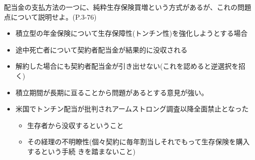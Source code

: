 \documentclass[report,gutter=10mm,fore-edge=10mm,uplatex,dvipdfmx]{jlreq}
\begin{document}
配当金の支払方法の一つに、純粋生存保険買増という方式があるが、これの問題点について説明せよ。(P.3-76)

\begin{itemize}
 \item 積立型の年金保険について生存保障性(トンチン性)を強化しようとする場合
 \item 途中死亡者について契約者配当金が結果的に没収される
 \item 解約した場合にも契約者配当金が引き出せない(これを認めると逆選択を招く)
 \item 積立期間が長期に亘ることから問題があるとする意見が強い。
 \item 米国でトンチン配当が批判されアームストロング調査以降全面禁止となった
\begin{itemize}
 \item 生存者から没収するということ
 \item その経理の不明瞭性(個々契約に毎年割当しそれでもって生存保険を購入するという手続
きを踏まないこと)
\end{itemize}
\end{itemize}
\end{document}
